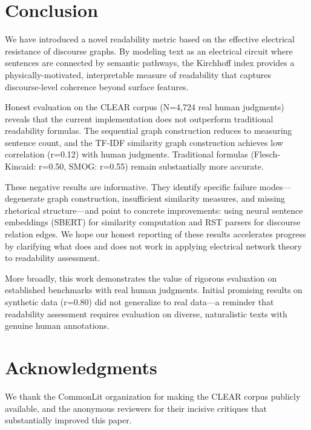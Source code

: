 \documentclass[11pt,letterpaper]{article}
\begin{document}
\section{Conclusion}

We have introduced a novel readability metric based on the effective electrical resistance of discourse graphs. By modeling text as an electrical circuit where sentences are connected by semantic pathways, the Kirchhoff index provides a physically-motivated, interpretable measure of readability that captures discourse-level coherence beyond surface features.

Honest evaluation on the CLEAR corpus (N=4,724 real human judgments) reveals that the current implementation does not outperform traditional readability formulas. The sequential graph construction reduces to measuring sentence count, and the TF-IDF similarity graph construction achieves low correlation (r=0.12) with human judgments. Traditional formulas (Flesch-Kincaid: r=0.50, SMOG: r=0.55) remain substantially more accurate.

These negative results are informative. They identify specific failure modes---degenerate graph construction, insufficient similarity measures, and missing rhetorical structure---and point to concrete improvements: using neural sentence embeddings (SBERT) for similarity computation and RST parsers for discourse relation edges. We hope our honest reporting of these results accelerates progress by clarifying what does and does not work in applying electrical network theory to readability assessment.

More broadly, this work demonstrates the value of rigorous evaluation on established benchmarks with real human judgments. Initial promising results on synthetic data (r=0.80) did not generalize to real data---a reminder that readability assessment requires evaluation on diverse, naturalistic texts with genuine human annotations.

\section*{Acknowledgments}

We thank the CommonLit organization for making the CLEAR corpus publicly available, and the anonymous reviewers for their incisive critiques that substantially improved this paper.



\end{document}

